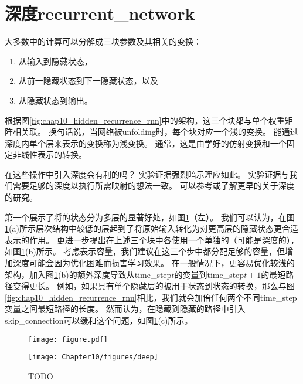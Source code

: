 \section{深度\gls{recurrent_network}}
\label{sec:deep_recurrent_networks}
大多数中的计算可以分解成三块参数及其相关的变换：
\begin{enumerate}
 \item 从输入到隐藏状态，
 \item 从前一隐藏状态到下一隐藏状态，以及
 \item 从隐藏状态到输出。
\end{enumerate}
根据图\ref{fig:chap10_hidden_recurrence_rnn}中的架构，这三个块都与单个权重矩阵相关联。
换句话说，当网络被\gls{unfolding}时，每个块对应一个浅的变换。
能通过深度内单个层来表示的变换称为浅变换。
通常，这是由学好的仿射变换和一个固定非线性表示的转换。

在这些操作中引入深度会有利的吗？
实验证据\citep{Graves-arxiv2013,Pascanu-et-al-ICLR2014}强烈暗示理应如此。
实验证据与我们需要足够的深度以执行所需映射的想法一致。
可以参考\cite{Schmidhuber96,ElHihi+Bengio-nips8}或\cite{Jaeger2007}了解更早的关于深度的研究。

\cite{Graves-arxiv2013}第一个展示了将的状态分为多层的显著好处，如图\ref{fig:chap10_deep}（左）。
我们可以认为，在图\ref{fig:chap10_deep}(a)所示层次结构中较低的层起到了将原始输入转化为对更高层的隐藏状态更合适表示的作用。
\cite{Pascanu-et-al-ICLR2014}更进一步提出在上述三个块中各使用一个单独的（可能是深度的），如图\ref{fig:chap10_deep}(b)所示。
考虑表示容量，我们建议在这三个步中都分配足够的容量，但增加深度可能会因为优化困难而损害学习效果。
在一般情况下，更容易优化较浅的架构，加入图\ref{fig:chap10_deep}(b)的额外深度导致从\gls{time_step}$t$的变量到\gls{time_step}$t+1$的最短路径变得更长。
例如，如果具有单个隐藏层的被用于状态到状态的转换，那么与图\ref{fig:chap10_hidden_recurrence_rnn}相比，我们就会加倍任何两个不同\gls{time_step}变量之间最短路径的长度。
然而\cite{Pascanu-et-al-ICLR2014}认为，在隐藏到隐藏的路径中引入\gls{skip_connection}可以缓和这个问题，如图\ref{fig:chap10_deep}(c)所示。


\begin{figure}[!htb]
\ifOpenSource
\centerline{\texttt{[image: figure.pdf]}}
\else
\centerline{\texttt{[image: Chapter10/figures/deep]}}
\fi
\caption{TODO}
\label{fig:chap10_deep}
\end{figure}

